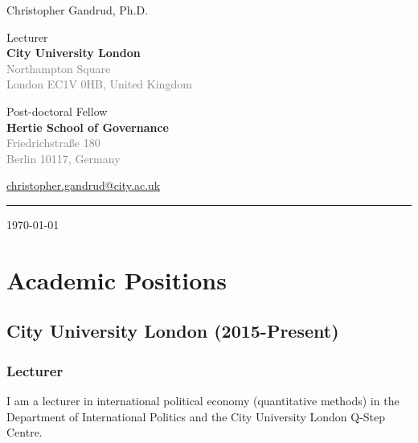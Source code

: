 \documentclass[a4paper]{article}
\begin{document}
    \begin{flushright}
        {\huge{Christopher Gandrud, Ph.D.}} \\
        \vspace{0.25cm}

        Lecturer \\
        {\bf{\large{City University London}}} \\
        \textcolor{gray}{Northampton Square \\
        London EC1V 0HB, United Kingdom} \\
        \vspace{0.25cm}

        Post-doctoral Fellow \\
        {\bf{\large{Hertie School of Governance}}} \\
        \textcolor{gray}{Friedrichstra{\ss}e 180\\
        Berlin 10117, Germany} \\
        \vspace{0.25cm}

        \href{mailto:christopher.gandrud@city.ac.uk}{christopher.gandrud@city.ac.uk}\\[0.25cm]

        \medskip\hrule height 1pt

        \vspace{0.5cm}

        \today

    \end{flushright}



\vspace{0.5cm}

\section*{Academic Positions}

\subsection*{City University London (2015-Present)}

\subsubsection*{Lecturer}

I am a lecturer in international political economy (quantitative methods) in the Department of International Politics and the City University London Q-Step Centre.
\end{document}
